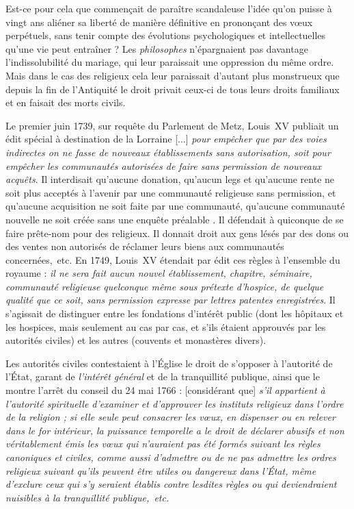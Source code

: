  Est-ce pour cela que commençait de paraître scandaleuse
l'idée qu'on puisse à vingt ans aliéner sa liberté de manière définitive en prononçant des vœux perpétuels, sans tenir compte des évolutions psychologiques et intellectuelles qu'une vie peut entraîner ? Les \emph{philosophes} n'épargnaient pas davantage l'indissolubilité du mariage, qui leur paraissait une oppression du même ordre. Mais dans le cas des religieux cela leur paraissait d'autant plus monstrueux que depuis la fin de l'Antiquité le droit privait ceux-ci de tous leurs droits familiaux et en faisait des morts civils. 

 Le premier juin 1739, sur requête du Parlement de Metz, Louis~XV publiait un édit spécial à destination de la Lorraine {[...] \emph{pour empêcher que par des voies indirectes on ne fasse de nouveaux établissements sans autorisation, soit pour empêcher les communautés autorisées de faire sans permission de nouveaux acquêts}}. Il interdisait qu'aucune donation, qu'aucun legs et qu'aucune rente ne soit plus acceptés à l'avenir par une communauté religieuse sans permission, et qu'aucune acquisition ne soit faite par une communauté, qu'aucune communauté nouvelle ne soit créée sans une enquête préalable . Il défendait à quiconque de se faire prête-nom pour des religieux. Il donnait droit aux gens lésés par des dons ou des ventes non autorisés de réclamer leurs biens aux communautés concernées,~etc. En 1749, Louis~XV étendait par édit ces règles à l'ensemble du royaume : \emph{il ne sera fait aucun nouvel établissement, chapitre, séminaire, communauté religieuse quelconque même sous prétexte d'hospice, de quelque qualité que ce soit, sans permission expresse par lettres patentes enregistrées}. Il s'agissait de distinguer entre les fondations d'intérêt public (dont les hôpitaux et les hospices, mais seulement au cas par cas, et s'ils étaient approuvés par les autorités civiles) et les autres (couvents et monastères divers). 

 Les autorités civiles contestaient à l'Église le droit de s'opposer à l'autorité de l'État, garant de \emph{l'intérêt général} et de la tranquillité publique, ainsi que le montre l'arrêt du conseil du 24 mai 1766 : [considérant que] \emph{s'il appartient à l'autorité spirituelle d'examiner et d'approuver les instituts religieux dans l'ordre de la religion ; si elle seule peut consacrer les vœux, en dispenser ou en relever dans le for intérieur, la puissance temporelle a le droit de déclarer abusifs et non véritablement émis les vœux qui n'auraient pas été formés suivant les règles canoniques et civiles, comme aussi d'admettre ou de ne pas admettre les ordres religieux suivant qu'ils peuvent être utiles ou dangereux dans l'État, même d'exclure ceux qui s'y seraient établis contre lesdites règles ou qui deviendraient nuisibles à la tranquillité publique,~etc.}
 
